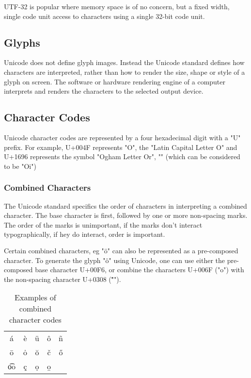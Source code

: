 UTF-32 is popular where memory space is of no concern, but a fixed
width, single code unit access to characters using a single 32-bit code
unit.

\subsection{Glyphs}

Unicode does not define glyph images. Instead the Unicode standard
defines how characters are interpreted, rather than how to render the
size, shape or style of a glyph on screen. The software or hardware 
rendering engine of a computer interprets and renders the characters to 
the selected output device.

\subsection{Character Codes}

Unicode character codes are represented by a four hexadecimal digit with
a "U" prefix. For example, U+004F represents "O", the "Latin Capital 
Letter O" and U+1696 represents the symbol "Ogham Letter Or", "\OghamOr"
(which can be considered to be "Oi")

\subsubsection{Combined Characters}

The Unicode standard specifics the order of characters in interpreting 
a combined character. The base character is first, followed by one or
more non-spacing marks. The order of the marks is unimportant, if the 
marks don't interact typographically, if hey do interact, order is
important.


Certain combined characters, eg "\"{o}" can also be represented as a
pre-composed character. To generate the glyph "\"{o}" using Unicode, one
can use either the pre-composed base character U+00F6, or combine the
characters U+006F ("o") with the non-spacing character U+0308 ("\"{ }").

\begin{table}

\begin{center}

\begin{tabular}{ccccc}
\'{a}	&	\`{e}	&	\"{u}	&	\^{o}	&	\~{n}	\\
\={o}	&	\.{o}	&	\u{o}	&	\v{c}	&	\H{o}	\\
\t{oo}&	\c{c}	&	\d{o}	&	\b{o}	&			\\
\end{tabular}

\end{center}

\caption{Examples of combined character codes}

\end{table}

